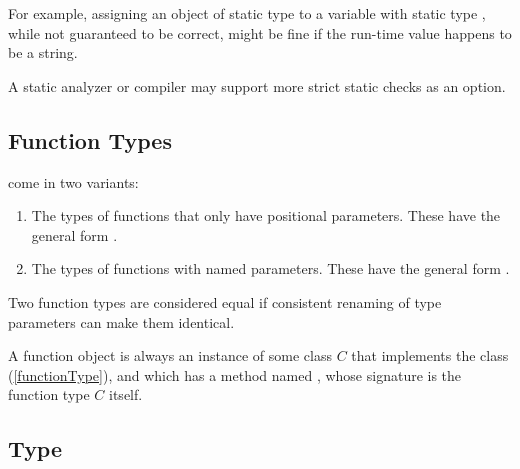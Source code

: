 \documentclass[makeidx]{article}
\begin{document}
{{For example, assigning an object of static type 
to a variable with static type ,
while not guaranteed to be correct,
might be fine if the run-time value happens to be a string.

A static analyzer or compiler
may support more strict static checks as an option.
}


\subsection{Function Types}

\LMHash{}%
come in two variants:
\begin{enumerate}
\item
  The types of functions that only have positional parameters.
  These have the general form
  .
\item
  The types of functions with named parameters.
  These have the general form
  .
\end{enumerate}


\LMHash{}%
Two function types are considered equal if consistent renaming of type
parameters can make them identical.


\LMHash{}%
A function object is always an instance of some class $C$ that implements
the class \FUNCTION{} (\ref{functionType}),
and which has a method named \CALL{},
whose signature is the function type $C$ itself.


\subsection{Type \FUNCTION{}}

}
\end{document}
